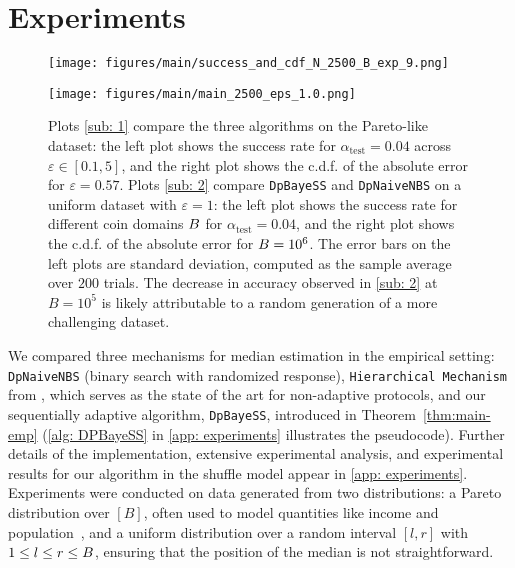 \section{Experiments}\label{sec:experiments}

\begin{figure}[t]
    \centering
    \begin{minipage}{0.48\textwidth}
        \centering
        \texttt{[image: figures/main/success\_and\_cdf\_N\_2500\_B\_exp\_9.png]}
        \label{sub: 1}
    \end{minipage}%
    \hspace{0.02\textwidth}
    \begin{minipage}{0.48\textwidth}
        \centering
        \texttt{[image: figures/main/main\_2500\_eps\_1.0.png]}
        \label{sub: 2}
    \end{minipage}
    \caption{Plots \ref{sub: 1} compare the three algorithms on the Pareto-like dataset: the left plot shows the success rate for $\alpha_{\text{test}}= 0.04$ across $\varepsilon\in[0.1, 5]$, and the right plot shows the c.d.f. of the absolute error for $\varepsilon = 0.57$. Plots \ref{sub: 2} compare \texttt{DpBayeSS} and \texttt{DpNaiveNBS} on a uniform dataset with $\varepsilon=1$: the left plot shows the success rate for different coin domains $B$ for $\alpha_{\text{test}}=0.04$, and the right plot shows the c.d.f. of the absolute error for $B=10^6$. The error bars on the left plots are standard deviation, computed as the sample average over $200$ trials. The decrease in accuracy observed in \cref{sub: 2} at $B = 10^5$ is likely attributable to a random generation of a more challenging dataset.
    }
    \label{fig: main results}
\end{figure}

We compared three mechanisms for median estimation in the empirical setting: \texttt{DpNaiveNBS} (binary search with randomized response), \texttt{Hierarchical Mechanism} from \cite{kulkarni2019answering}, which serves as the state of the art for non-adaptive protocols, and our sequentially adaptive algorithm, \texttt{DpBayeSS}, introduced in Theorem~\ref{thm:main-emp} (\cref{alg: DPBayeSS} in \cref{app: experiments} illustrates the pseudocode). Further details of the implementation, extensive experimental analysis, and experimental results for our algorithm in the shuffle model appear in \cref{app: experiments}. Experiments were conducted on data generated from two distributions: a Pareto distribution over $[B]$, often used to model quantities like income and population~\cite{arnold2014pareto}, and a uniform distribution over a random interval $[l,r]$ with $1 \leq l \leq r \leq B$, ensuring that the position of the median is not straightforward.

